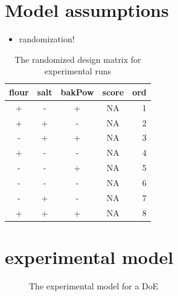 \documentclass[
  a4paper,
]{scrbook}
\providecommand{\tightlist}{%
  \setlength{\itemsep}{0pt}\setlength{\parskip}{0pt}}\usepackage{longtable,booktabs,array}
\begin{document}
\section{Model assumptions}\label{model-assumptions}

\begin{itemize}
\tightlist
\item
  randomization!
\end{itemize}

\begingroup
\fontsize{12.0pt}{14.4pt}\selectfont

\begin{longtable}{ccccr}

\caption{\label{tbl-dm-rnd}The randomized design matrix for experimental
runs}

\tabularnewline

\toprule
flour & salt & bakPow & score & ord \\ 
\midrule\addlinespace[2.5pt]
+ & - & + & NA & 1 \\ 
+ & + & - & NA & 2 \\ 
- & + & + & NA & 3 \\ 
+ & - & - & NA & 4 \\ 
- & - & + & NA & 5 \\ 
- & - & - & NA & 6 \\ 
- & + & - & NA & 7 \\ 
+ & + & + & NA & 8 \\ 
\bottomrule

\end{longtable}

\endgroup

\section{experimental model}\label{experimental-model}

\begin{figure}[ht]


\caption{\label{fig-exp-mdl}The experimental model for a DoE}

\end{figure}%
\end{document}
